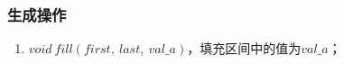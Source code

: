 \subsubsection{生成操作}
\begin{enumerate}
    \item $void\ fill(first,\ last,\ val\_a)$，填充区间中的值为$val\_a$；
\end{enumerate}